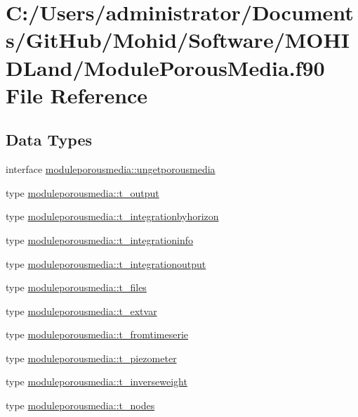 \hypertarget{_module_porous_media_8f90}{}\section{C\+:/\+Users/administrator/\+Documents/\+Git\+Hub/\+Mohid/\+Software/\+M\+O\+H\+I\+D\+Land/\+Module\+Porous\+Media.f90 File Reference}
\label{_module_porous_media_8f90}
\subsection*{Data Types}
\begin{DoxyCompactItemize}
\item 
interface \mbox{\hyperlink{interfacemoduleporousmedia_1_1ungetporousmedia}{moduleporousmedia\+::ungetporousmedia}}
\item 
type \mbox{\hyperlink{structmoduleporousmedia_1_1t__output}{moduleporousmedia\+::t\+\_\+output}}
\item 
type \mbox{\hyperlink{structmoduleporousmedia_1_1t__integrationbyhorizon}{moduleporousmedia\+::t\+\_\+integrationbyhorizon}}
\item 
type \mbox{\hyperlink{structmoduleporousmedia_1_1t__integrationinfo}{moduleporousmedia\+::t\+\_\+integrationinfo}}
\item 
type \mbox{\hyperlink{structmoduleporousmedia_1_1t__integrationoutput}{moduleporousmedia\+::t\+\_\+integrationoutput}}
\item 
type \mbox{\hyperlink{structmoduleporousmedia_1_1t__files}{moduleporousmedia\+::t\+\_\+files}}
\item 
type \mbox{\hyperlink{structmoduleporousmedia_1_1t__extvar}{moduleporousmedia\+::t\+\_\+extvar}}
\item 
type \mbox{\hyperlink{structmoduleporousmedia_1_1t__fromtimeserie}{moduleporousmedia\+::t\+\_\+fromtimeserie}}
\item 
type \mbox{\hyperlink{structmoduleporousmedia_1_1t__piezometer}{moduleporousmedia\+::t\+\_\+piezometer}}
\item 
type \mbox{\hyperlink{structmoduleporousmedia_1_1t__inverseweight}{moduleporousmedia\+::t\+\_\+inverseweight}}
\item 
type \mbox{\hyperlink{structmoduleporousmedia_1_1t__nodes}{moduleporousmedia\+::t\+\_\+nodes}}
\item 

\end{DoxyCompactItemize}
